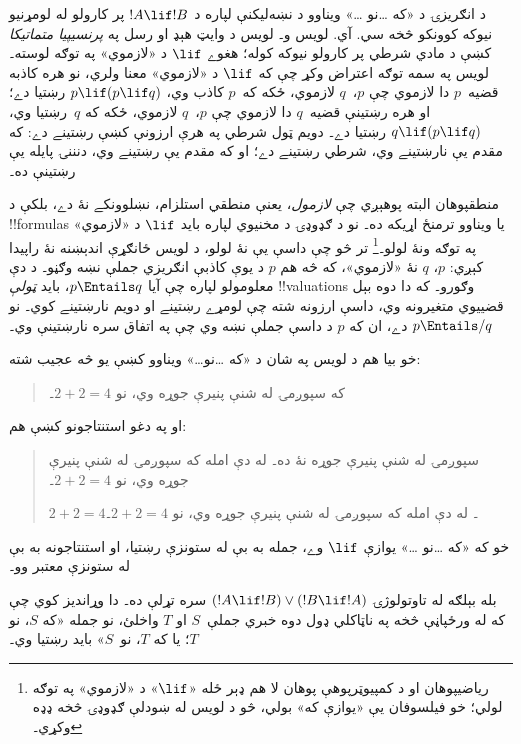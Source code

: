 \documentclass[../../../include/open-logic-section]{subfiles}
\begin{document}


د انګريزۍ د «که \dots نو \dots» ويناوو د نښه‌ليکنې لپاره د
$!A \lif !B$ پر کارولو له لومړنيو نيوکه کوونکو څخه سي. آي.
لويس و۔ لويس د وايټ هېډ او رسل په \emph{پرنسيپيا متماتيکا}
کښې د مادي شرطي پر کارولو نيوکه کوله؛ هغوے $\lif$ د
«لازموي» په توګه لوسته۔ لويس په سمه توګه اعتراض وکړ چې که
$\lif$ د «لازموي» معنا ولري، نو هره کاذبه قضيه~$p$ دا
لازموي چې $p$،~$q$ لازموي، ځکه که~$p$ کاذب وي،
$p \lif (p \lif q)$ رښتيا دے؛ او هره رښتينې قضيه~$q$ دا
لازموي چې $p$،~$q$ لازموي، ځکه که $q$~رښتيا وي،
$q \lif (p \lif q)$ رښتيا دے۔ دويم ټول شرطي په هرې ارزونې
کښې رښتينے دے: که مقدم يې نارښتينے وي، شرطي رښتينے دے؛ او
که مقدم يې رښتينے وي، دنننۍ پايله يې رښتينې ده۔

منطقپوهان البته پوهېږي چې \emph{لازمول}، يعنې منطقي
استلزام، نښلوونکے نۀ دے، بلکې د !!{formula}s يا ويناوو
ترمنځ اړيکه ده۔ نو د ګډوډۍ د مخنيوي لپاره بايد $\lif$ د
«لازموي» په توګه ونۀ لولو۔\footnote{رياضيپوهان او د
  کمپيوټرپوهې پوهان لا هم ډېر ځله «$\lif$» د «لازموي» په
  توګه لولي؛ خو فيلسوفان يې «يوازې که» بولي، څو د لويس له
  ښودلې ګډوډۍ څخه ډډه وکړي۔} تر څو چې داسې يې نۀ لولو، د
لويس ځانګړې اندېښنه نۀ راپيدا کېږي: $p$، $q$ نۀ «لازموي»،
که څه هم $p$ د يوې کاذبې انګريزي جملې نښه وګڼو۔ د دې معلومولو
لپاره چې آيا $p \Entails q$، بايد \emph{ټولې}
!!{valuation}s وګورو۔ که دا دوه بېل قضييوي متغيرونه وي،
داسې ارزونه شته چې لومړے رښتينے او دويم نارښتينے کوي۔ نو
$p \Entails/ q$ دے، ان که $p$ د داسې جملې نښه وي چې په
اتفاق سره نارښتينې وي۔

خو بيا هم د لويس په شان د «که \dots نو\dots» ويناوو کښې يو
څه عجيب شته:
\begin{quote}
که سپوږمۍ له شنې پنيرې جوړه وي، نو $2+2=4$۔
\end{quote}
او په دغو استنتاجونو کښې هم:
\begin{quote}
  سپوږمۍ له شنې پنيرې جوړه نۀ ده۔ له دې امله که سپوږمۍ له شنې
  پنيرې جوړه وي، نو $2+2=4$۔

  $2+2 = 4$۔ له دې امله که سپوږمۍ له شنې پنيرې جوړه وي، نو
  $2+2=4$۔
\end{quote}
خو که «که \dots نو \dots» يوازې $\lif$ وے، جمله به بې له
ستونزې رښتيا، او استنتاجونه به بې له ستونزې معتبر وو۔

بله بېلګه له تاوتولوژۍ $(!A \lif !B) \lor (!B \lif !A)$ سره
تړلې ده۔ دا وړانديز کوي چې که له ورځپاڼې څخه په ناټاکلي ډول
دوه خبري جملې~$S$ او $T$ واخلئ، نو جمله «که $S$، نو $T$؛
يا که $T$، نو~$S$» بايد رښتيا وي۔
\end{document}
